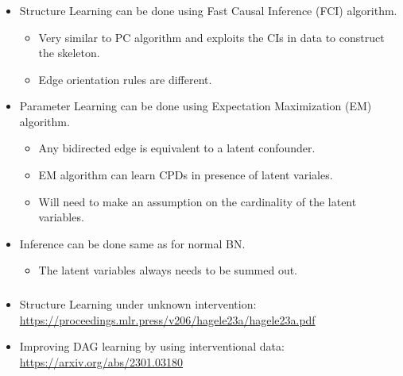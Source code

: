 \documentclass{beamer}
\begin{document}
\begin{frame}
	\frametitle{}
	\begin{itemize}
		\item Structure Learning can be done using Fast Causal Inference (FCI) algorithm.
			\begin{itemize}
				\item Very similar to PC algorithm and exploits the CIs in data to construct the skeleton.
				\item Edge orientation rules are different.
			\end{itemize}
		\item Parameter Learning can be done using Expectation Maximization (EM) algorithm.
			\begin{itemize}
				\item Any bidirected edge is equivalent to a latent confounder.
				\item EM algorithm can learn CPDs in presence of latent variales.
				\item Will need to make an assumption on the cardinality of the latent variables.
			\end{itemize}
		\item Inference can be done same as for normal BN.
			\begin{itemize}
				\item The latent variables always needs to be summed out.
			\end{itemize}
	\end{itemize}
\end{frame}

\begin{frame}
	\frametitle{}
	\begin{itemize}
		\item Structure Learning under unknown intervention:  \url{https://proceedings.mlr.press/v206/hagele23a/hagele23a.pdf}
		\item Improving DAG learning by using interventional data: \url{https://arxiv.org/abs/2301.03180}
	\end{itemize}
\end{frame}
\end{document}
